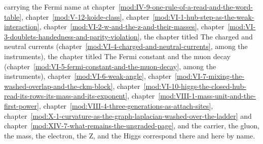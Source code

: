 \begin{chbridge}
carrying the Fermi name at chapter~\ref{mod:IV-9-one-rule-of-a-read-and-the-word-table}, chapter~\ref{mod:V-12-koide-class}, chapter~\ref{mod:VI-1-hub-step-as-the-weak-interaction}, chapter~\ref{mod:VI-2-w-and-the-z-and-their-masses}, chapter~\ref{mod:VI-3-doublets-handedness-and-parity-violation}, the chapter titled The charged and neutral currents (chapter~\ref{mod:VI-4-charged-and-neutral-currents}, among the instruments), the chapter titled The Fermi constant and the muon decay (chapter~\ref{mod:VI-5-fermi-constant-and-the-muon-decay}, among the instruments), chapter~\ref{mod:VI-6-weak-angle}, chapter~\ref{mod:VI-7-mixing-the-washed-overlap-and-the-ckm-block}, chapter~\ref{mod:VI-10-higgs-the-closed-hub-read-its-rows-its-mass-and-its-exponent}, chapter~\ref{mod:VIII-1-mass-unit-and-the-first-power}, chapter~\ref{mod:VIII-4-three-generations-as-attach-sites}, chapter~\ref{mod:X-1-curvature-as-the-graph-laplacian-washed-over-the-ladder} and chapter~\ref{mod:XIV-7-what-remains-the-ungraded-page}, and the carrier, the gluon, the mass, the electron, the Z, and the Higgs correspond there and here by name.
\end{chbridge}

